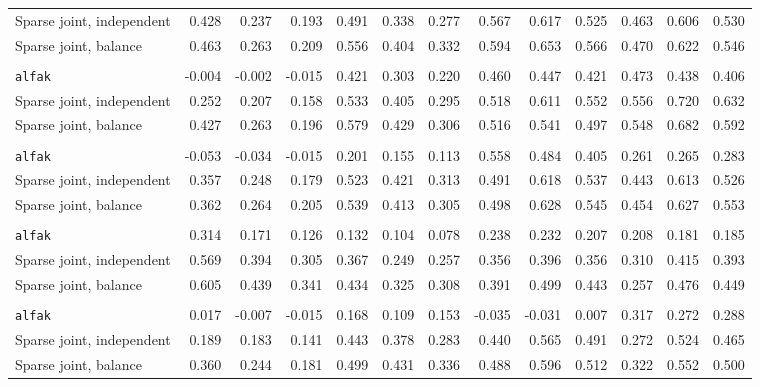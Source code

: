 \begin{center}
\begin{tabular}{l*{12}{r}}
\quad Sparse joint, independent & 0.428 & 0.237 & 0.193 & 0.491 & 0.338 & 0.277 & 0.567 & 0.617 & 0.525 & 0.463 & 0.606 & 0.530 \\
\quad Sparse joint, balance & 0.463 & 0.263 & 0.209 & 0.556 & 0.404 & 0.332 & 0.594 & 0.653 & 0.566 & 0.470 & 0.622 & 0.546 \\
\addlinespace[2pt]
\multicolumn{13}{l}{\textit{500/700, 1080 d}} \\
\quad \texttt{alfak} & -0.004 & -0.002 & -0.015 & 0.421 & 0.303 & 0.220 & 0.460 & 0.447 & 0.421 & 0.473 & 0.438 & 0.406 \\
\quad Sparse joint, independent & 0.252 & 0.207 & 0.158 & 0.533 & 0.405 & 0.295 & 0.518 & 0.611 & 0.552 & 0.556 & 0.720 & 0.632 \\
\quad Sparse joint, balance & 0.427 & 0.263 & 0.196 & 0.579 & 0.429 & 0.306 & 0.516 & 0.541 & 0.497 & 0.548 & 0.682 & 0.592 \\
\addlinespace[2pt]
\multicolumn{13}{l}{\textit{500/700, bottleneck}} \\
\quad \texttt{alfak} & -0.053 & -0.034 & -0.015 & 0.201 & 0.155 & 0.113 & 0.558 & 0.484 & 0.405 & 0.261 & 0.265 & 0.283 \\
\quad Sparse joint, independent & 0.357 & 0.248 & 0.179 & 0.523 & 0.421 & 0.313 & 0.491 & 0.618 & 0.537 & 0.443 & 0.613 & 0.526 \\
\quad Sparse joint, balance & 0.362 & 0.264 & 0.205 & 0.539 & 0.413 & 0.305 & 0.498 & 0.628 & 0.545 & 0.454 & 0.627 & 0.553 \\
\addlinespace[2pt]
\multicolumn{13}{l}{\textit{100/3000, 360 d}} \\
\quad \texttt{alfak} & 0.314 & 0.171 & 0.126 & 0.132 & 0.104 & 0.078 & 0.238 & 0.232 & 0.207 & 0.208 & 0.181 & 0.185 \\
\quad Sparse joint, independent & 0.569 & 0.394 & 0.305 & 0.367 & 0.249 & 0.257 & 0.356 & 0.396 & 0.356 & 0.310 & 0.415 & 0.393 \\
\quad Sparse joint, balance & 0.605 & 0.439 & 0.341 & 0.434 & 0.325 & 0.308 & 0.391 & 0.499 & 0.443 & 0.257 & 0.476 & 0.449 \\
\addlinespace[2pt]
\multicolumn{13}{l}{\textit{3000/100, 360 d}} \\
\quad \texttt{alfak} & 0.017 & -0.007 & -0.015 & 0.168 & 0.109 & 0.153 & -0.035 & -0.031 & 0.007 & 0.317 & 0.272 & 0.288 \\
\quad Sparse joint, independent & 0.189 & 0.183 & 0.141 & 0.443 & 0.378 & 0.283 & 0.440 & 0.565 & 0.491 & 0.272 & 0.524 & 0.465 \\
\quad Sparse joint, balance & 0.360 & 0.244 & 0.181 & 0.499 & 0.431 & 0.336 & 0.488 & 0.596 & 0.512 & 0.322 & 0.552 & 0.500 \\
\bottomrule
\end{tabular}
\end{center}

